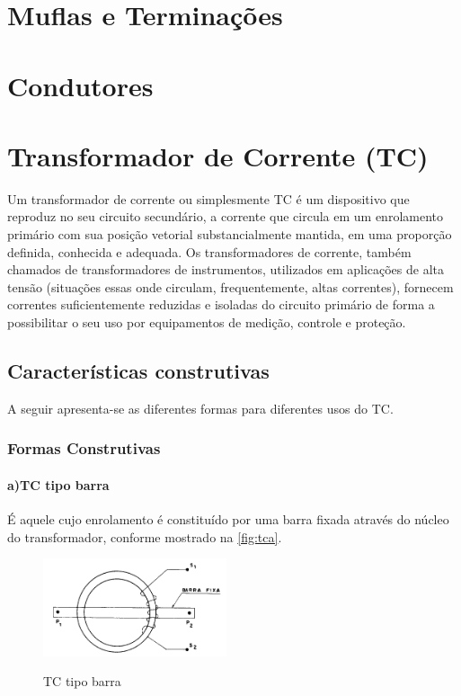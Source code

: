 \documentclass[a5paper,english,spanish,brazil]{ufsc-thesis}
\begin{document}
	\section{Muflas e Terminações}

	\section{Condutores}

	\section{Transformador de Corrente (TC)}
		Um transformador de corrente ou simplesmente TC é um dispositivo que reproduz no seu circuito secundário, a corrente que circula em um enrolamento primário com sua posição vetorial substancialmente mantida, em uma proporção definida, conhecida e adequada. Os transformadores de corrente, também chamados de transformadores de instrumentos, utilizados em aplicações de alta tensão (situações essas onde circulam, frequentemente, altas correntes), fornecem correntes suficientemente reduzidas e isoladas do circuito primário de forma a possibilitar o seu uso por equipamentos de medição, controle e proteção.\cite{mamedemanual}

		\subsection{Características construtivas}
			A seguir apresenta-se as diferentes formas para diferentes usos do TC.

			\subsubsection{Formas Construtivas}
				\paragraph*{a)\indent TC tipo barra}
					É aquele cujo enrolamento é constituído por uma barra fixada através do núcleo do transformador, conforme mostrado na \autoref{fig:tca}.
					\begin{figure}[htb]
						\caption{TC tipo barra}
						\centering
						\includegraphics[width=5.4cm]{TC(1).png}
						\label{fig:tca}
					\end{figure}
\end{document}
